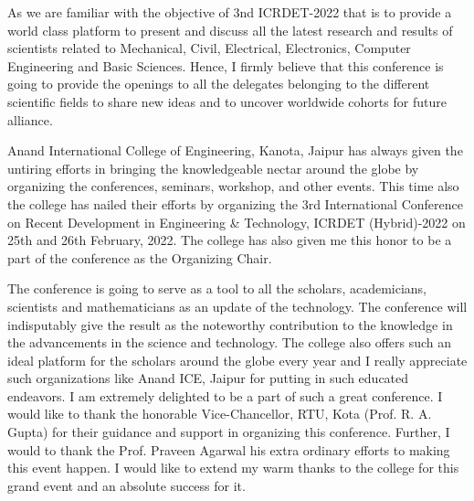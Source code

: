 \documentclass[twoside,11pt]{amsart}
\begin{document}
As we are familiar with the objective of 3nd ICRDET-2022 that is to provide a world class platform to present and discuss all the latest research and results of scientists related to Mechanical, Civil, Electrical, Electronics, Computer Engineering and Basic Sciences. Hence, I firmly believe that this conference is going to provide the openings to all the delegates belonging to the different scientific fields to share new ideas and to uncover worldwide cohorts for future alliance.

Anand International College of Engineering, Kanota, Jaipur has always given the untiring efforts in bringing the knowledgeable nectar around the globe by organizing the conferences, seminars, workshop, and other events. This time also the college has nailed their efforts by organizing the 3rd International Conference on Recent Development in Engineering \& Technology, ICRDET (Hybrid)-2022 on 25th and 26th February, 2022. The college has also given me this honor to be a part of the conference as the Organizing Chair.

The conference is going to serve as a tool to all the scholars, academicians, scientists and mathematicians as an update of the technology. The conference will indisputably give the result as the noteworthy contribution to the knowledge in the advancements in the science and technology. The college also offers such an ideal platform for the scholars around the globe every year and I really appreciate such organizations like Anand ICE, Jaipur for putting in such educated endeavors. I am extremely delighted to be a part of such a great conference.
\vskip 1mm
\newpage
\vskip 1mm
I would like to thank the honorable Vice-Chancellor, RTU, Kota (Prof. R. A. Gupta) for their guidance and support in organizing this conference. Further, I would to thank the Prof. Praveen Agarwal his extra ordinary efforts to making this event happen.
I would like to extend my warm thanks to the college for this grand event and an absolute success for it.
\end{document}
